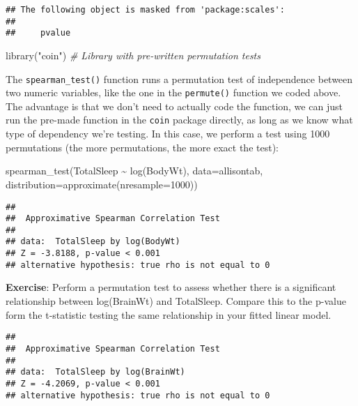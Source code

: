 \documentclass[
]{book}
\newenvironment{Shaded}{\begin{snugshade}}{\end{snugshade}}
\newcommand{\AttributeTok}[1]{\textcolor[rgb]{0.77,0.63,0.00}{#1}}
\newcommand{\CommentTok}[1]{\textcolor[rgb]{0.56,0.35,0.01}{\textit{#1}}}
\newcommand{\DecValTok}[1]{\textcolor[rgb]{0.00,0.00,0.81}{#1}}
\newcommand{\FunctionTok}[1]{\textcolor[rgb]{0.00,0.00,0.00}{#1}}
\newcommand{\NormalTok}[1]{#1}
\newcommand{\SpecialCharTok}[1]{\textcolor[rgb]{0.00,0.00,0.00}{#1}}
\newcommand{\StringTok}[1]{\textcolor[rgb]{0.31,0.60,0.02}{#1}}
\begin{document}
\begin{verbatim}
## The following object is masked from 'package:scales':
## 
##     pvalue
\end{verbatim}

\begin{Shaded}
\begin{Highlighting}[]
\FunctionTok{library}\NormalTok{(}\StringTok{"coin"}\NormalTok{) }\CommentTok{\# Library with pre{-}written permutation tests}
\end{Highlighting}
\end{Shaded}

The \texttt{spearman\_test()} function runs a permutation test of independence between two numeric variables, like the one in the \texttt{permute()} function we coded above. The advantage is that we don't need to actually code the function, we can just run the pre-made function in the \texttt{coin} package directly, as long as we know what type of dependency we're testing. In this case, we perform a test using 1000 permutations (the more permutations, the more exact the test):

\begin{Shaded}
\begin{Highlighting}[]
\FunctionTok{spearman\_test}\NormalTok{(TotalSleep }\SpecialCharTok{\textasciitilde{}} \FunctionTok{log}\NormalTok{(BodyWt), }\AttributeTok{data=}\NormalTok{allisontab, }\AttributeTok{distribution=}\FunctionTok{approximate}\NormalTok{(}\AttributeTok{nresample=}\DecValTok{1000}\NormalTok{)) }
\end{Highlighting}
\end{Shaded}

\begin{verbatim}
## 
##  Approximative Spearman Correlation Test
## 
## data:  TotalSleep by log(BodyWt)
## Z = -3.8188, p-value < 0.001
## alternative hypothesis: true rho is not equal to 0
\end{verbatim}

\textbf{Exercise}: Perform a permutation test to assess whether there is a significant relationship between log(BrainWt) and TotalSleep. Compare this to the p-value form the t-statistic testing the same relationship in your fitted linear model.

\begin{verbatim}
## 
##  Approximative Spearman Correlation Test
## 
## data:  TotalSleep by log(BrainWt)
## Z = -4.2069, p-value < 0.001
## alternative hypothesis: true rho is not equal to 0
\end{verbatim}
\end{document}
